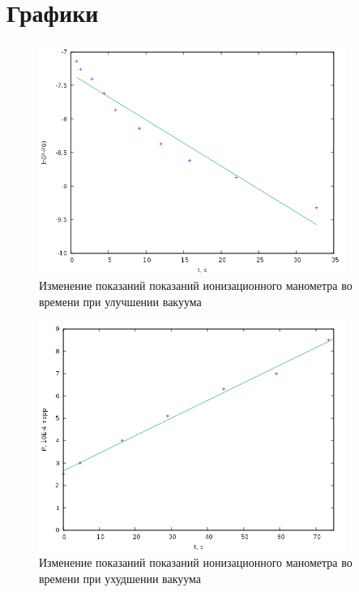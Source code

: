 \documentclass[a4paper]{article}
\begin{document}
	\section{Графики}
	\begin{figure}[ht!]
		\centering
		\includegraphics[width=100mm]{graph1.png}
		\caption{Изменение показаний показаний ионизационного манометра во времени при улучшении вакуума\label{overflow}}
	\end{figure}
	\begin{figure}[ht!]
		\centering
		\includegraphics[width=100mm]{graph2.png}
		\caption{Изменение показаний показаний ионизационного манометра во времени при ухудшении вакуума\label{overflow}}
	\end{figure}
\end{document}
